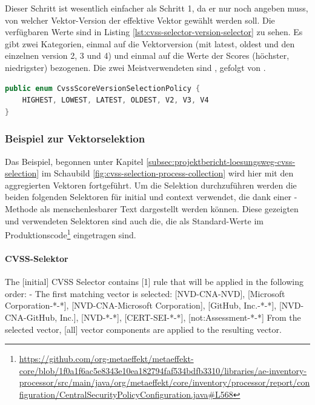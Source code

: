 Dieser Schritt ist wesentlich einfacher als Schritt 1, da er nur noch angeben muss, von welcher Vektor-Version der effektive Vektor gewählt werden soll.
Die verfügbaren Werte sind in Listing \ref{lst:cvss-selector-version-selector} zu sehen.
Es gibt zwei Kategorien, einmal auf die Vektorversion (mit latest, oldest und den einzelnen version 2, 3 und 4) und einmal auf die Werte der Scores (höchster, niedrigster) bezogenen.
Die zwei Meistverwendeten sind , gefolgt von .

\begin{lstlisting}[language=Java, label={lst:cvss-selector-version-selector}, caption={CVSS-Selektor Klassen}]
public enum CvssScoreVersionSelectionPolicy {
    HIGHEST, LOWEST, LATEST, OLDEST, V2, V3, V4
}
\end{lstlisting}

\subsubsection{Beispiel zur Vektorselektion} \label{subsubsec:projektbericht-loesungsweg-cvss-selection-example}

Das Beispiel, begonnen unter Kapitel \ref{subsec:projektbericht-loesungsweg-cvss-selection} im Schaubild \ref{fig:cvss-selection-process-collection} wird hier mit den aggregierten Vektoren fortgeführt.
Um die Selektion durchzuführen werden die beiden folgenden Selektoren für initial und context verwendet, die dank einer -Methode als menschenlesbarer Text dargestellt werden können.
Diese gezeigten und verwendeten Selektoren sind auch die, die als Standard-Werte im Produktionscode\footnote{\url{https://github.com/org-metaeffekt/metaeffekt-core/blob/1f0a1f6ac5e8343e10ea182794faf534bdfb3310/libraries/ae-inventory-processor/src/main/java/org/metaeffekt/core/inventory/processor/report/configuration/CentralSecurityPolicyConfiguration.java#L568}} eingetragen sind.

\paragraph{CVSS-Selektor } \label{par:projektbericht-loesungsweg-cvss-selection-example-selector-initial}

The [initial] CVSS Selector contains [1] rule that will be applied in the following order:\newline
- The first matching vector is selected: [NVD-CNA-NVD], [Microsoft Corporation-*-*], [NVD-CNA-Microsoft Corporation], [GitHub, Inc.-*-*], [NVD-CNA-GitHub, Inc.], [NVD-*-*], [CERT-SEI-*-*], [not:Assessment-*-*]\newline
From the selected vector, [all] vector components are applied to the resulting vector.

